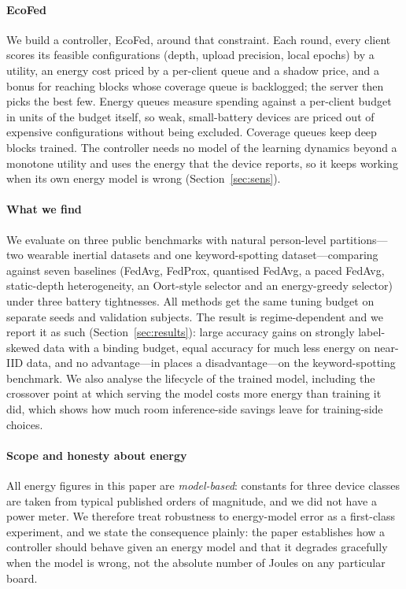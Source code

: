 \paragraph{EcoFed}
We build a controller, EcoFed, around that constraint. Each round, every client scores its feasible configurations (depth, upload precision, local epochs) by a utility, an energy cost priced by a per-client queue and a shadow price, and a bonus for reaching blocks whose coverage queue is backlogged; the server then picks the best few. Energy queues measure spending against a per-client budget in units of the budget itself, so weak, small-battery devices are priced out of expensive configurations without being excluded. Coverage queues keep deep blocks trained. The controller needs no model of the learning dynamics beyond a monotone utility and uses the energy that the device reports, so it keeps working when its own energy model is wrong (Section~\ref{sec:sens}).

\paragraph{What we find}
We evaluate on three public benchmarks with natural person-level partitions---two wearable inertial datasets and one keyword-spotting dataset---comparing against seven baselines (FedAvg, FedProx, quantised FedAvg, a paced FedAvg, static-depth heterogeneity, an Oort-style selector and an energy-greedy selector) under three battery tightnesses. All methods get the same tuning budget on separate seeds and validation subjects. The result is regime-dependent and we report it as such (Section~\ref{sec:results}): large accuracy gains on strongly label-skewed data with a binding budget, equal accuracy for much less energy on near-IID data, and no advantage---in places a disadvantage---on the keyword-spotting benchmark. We also analyse the lifecycle of the trained model, including the crossover point at which serving the model costs more energy than training it did, which shows how much room inference-side savings leave for training-side choices.

\paragraph{Scope and honesty about energy}
All energy figures in this paper are \emph{model-based}: constants for three device classes are taken from typical published orders of magnitude, and we did not have a power meter. We therefore treat robustness to energy-model error as a first-class experiment, and we state the consequence plainly: the paper establishes how a controller should behave given an energy model and that it degrades gracefully when the model is wrong, not the absolute number of Joules on any particular board.


